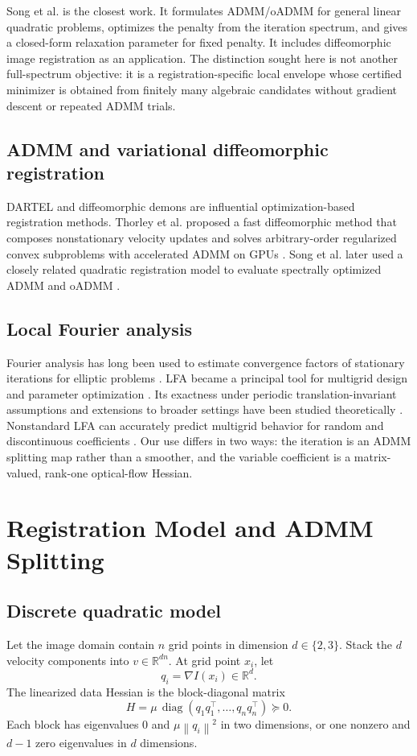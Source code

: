 \documentclass[11pt]{article}
\theoremstyle{definition}
\newcommand{\R}{\mathbb{R}}
\newcommand{\norm}[1]{\left\lVert #1\right\rVert}
\newcommand{\diag}{\operatorname{diag}}
\begin{document}
Song et al. \cite{Song2024} is the closest work. It formulates ADMM/oADMM for general linear quadratic problems, optimizes the penalty from the iteration spectrum, and gives a closed-form relaxation parameter for fixed penalty. It includes diffeomorphic image registration as an application. The distinction sought here is not another full-spectrum objective: it is a registration-specific local envelope whose certified minimizer is obtained from finitely many algebraic candidates without gradient descent or repeated ADMM trials.

\subsection{ADMM and variational diffeomorphic registration}
DARTEL \cite{Ashburner2007} and diffeomorphic demons \cite{Vercauteren2009} are influential optimization-based registration methods. Thorley et al. proposed a fast diffeomorphic method that composes nonstationary velocity updates and solves arbitrary-order regularized convex subproblems with accelerated ADMM on GPUs \cite{Thorley2021}. Song et al. later used a closely related quadratic registration model to evaluate spectrally optimized ADMM and oADMM \cite{Song2024}.

\subsection{Local Fourier analysis}
Fourier analysis has long been used to estimate convergence factors of stationary iterations for elliptic problems \cite{ChanElman1989}. LFA became a principal tool for multigrid design and parameter optimization \cite{WienandsJoppich2005}. Its exactness under periodic translation-invariant assumptions and extensions to broader settings have been studied theoretically \cite{Rodrigo2017}. Nonstandard LFA can accurately predict multigrid behavior for random and discontinuous coefficients \cite{Kumar2019}. Our use differs in two ways: the iteration is an ADMM splitting map rather than a smoother, and the variable coefficient is a matrix-valued, rank-one optical-flow Hessian.

\section{Registration Model and ADMM Splitting}
\subsection{Discrete quadratic model}
Let the image domain contain $n$ grid points in dimension $d\in\{2,3\}$. Stack the $d$ velocity components into $v\in\R^{dn}$. At grid point $x_i$, let
\[
q_i=\nabla I(x_i)\in\R^d.
\]
The linearized data Hessian is the block-diagonal matrix
\begin{equation}
H=\mu\,\diag(q_1q_1^\top,\ldots,q_nq_n^\top)\succeq0.
\label{eq:H}
\end{equation}
Each block has eigenvalues $0$ and $\mu\norm{q_i}^2$ in two dimensions, or one nonzero and $d-1$ zero eigenvalues in $d$ dimensions.
\end{document}
